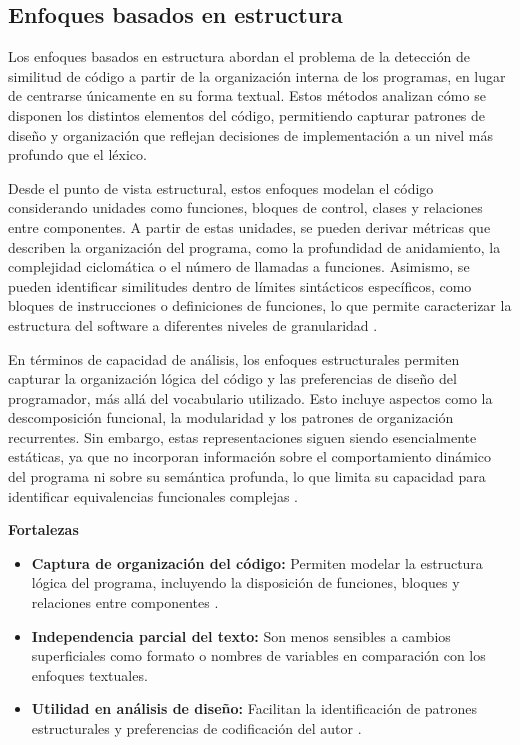 \subsection{Enfoques basados en estructura}

Los enfoques basados en estructura abordan el problema de la detección de similitud de código a partir de la organización interna de los programas, en lugar de centrarse únicamente en su forma textual. Estos métodos analizan cómo se disponen los distintos elementos del código, permitiendo capturar patrones de diseño y organización que reflejan decisiones de implementación a un nivel más profundo que el léxico.

Desde el punto de vista estructural, estos enfoques modelan el código considerando unidades como funciones, bloques de control, clases y relaciones entre componentes. A partir de estas unidades, se pueden derivar métricas que describen la organización del programa, como la profundidad de anidamiento, la complejidad ciclomática o el número de llamadas a funciones. Asimismo, se pueden identificar similitudes dentro de límites sintácticos específicos, como bloques de instrucciones o definiciones de funciones, lo que permite caracterizar la estructura del software a diferentes niveles de granularidad \cite{Roy2007Survey, Horvath2026ProgrammerAttribution}.

En términos de capacidad de análisis, los enfoques estructurales permiten capturar la organización lógica del código y las preferencias de diseño del programador, más allá del vocabulario utilizado. Esto incluye aspectos como la descomposición funcional, la modularidad y los patrones de organización recurrentes. Sin embargo, estas representaciones siguen siendo esencialmente estáticas, ya que no incorporan información sobre el comportamiento dinámico del programa ni sobre su semántica profunda, lo que limita su capacidad para identificar equivalencias funcionales complejas \cite{Horvath2026ProgrammerAttribution}.

\textbf{Fortalezas}
\begin{itemize}
    \item \textbf{Captura de organización del código:} Permiten modelar la estructura lógica del programa, incluyendo la disposición de funciones, bloques y relaciones entre componentes \cite{Roy2007Survey}.
    
    \item \textbf{Independencia parcial del texto:} Son menos sensibles a cambios superficiales como formato o nombres de variables en comparación con los enfoques textuales.
    
    \item \textbf{Utilidad en análisis de diseño:} Facilitan la identificación de patrones estructurales y preferencias de codificación del autor \cite{Horvath2026ProgrammerAttribution}.
\end{itemize}

